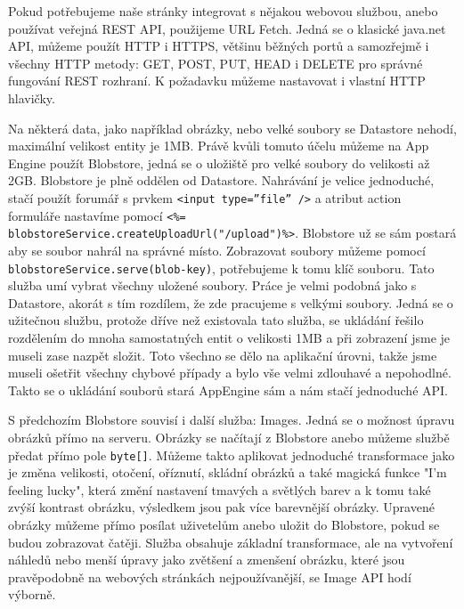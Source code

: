 Pokud potřebujeme naše stránky integrovat s nějakou webovou službou, anebo používat veřejná REST API, použijeme URL Fetch. Jedná se o klasické java.net API, můžeme použít HTTP i HTTPS, většinu běžných portů a samozřejmě i všechny HTTP metody: GET, POST, PUT, HEAD i DELETE pro správné fungování REST rozhraní. K požadavku můžeme nastavovat i vlastní HTTP hlavičky.

Na některá data, jako například obrázky, nebo velké soubory se Datastore nehodí, maximální velikost entity je 1MB. Právě kvůli tomuto účelu můžeme na App Engine použít Blobstore, jedná se o uložiště pro velké soubory do velikosti až 2GB. Blobstore je plně oddělen od Datastore. Nahrávání je velice jednoduché, stačí použít forumář s prvkem \verb|<input type=”file” />| a atribut action formuláře nastavíme pomocí \verb|<%= blobstoreService.createUploadUrl("/upload")%>|.
Blobstore už se sám postará aby se soubor nahrál na správné místo. Zobrazovat soubory můžeme pomocí \verb|blobstoreService.serve(blob-key)|, potřebujeme k tomu klíč souboru. Tato služba umí vybrat všechny uložené soubory. Práce je velmi podobná jako s Datastore, akorát s tím rozdílem, že zde pracujeme s velkými soubory. Jedná se o užitečnou službu, protože dříve než existovala tato služba, se ukládání řešilo rozdělením do mnoha samostatných entit o velikosti 1MB a při zobrazení jsme je museli zase nazpět složit. Toto všechno se dělo na aplikační úrovni, takže jsme museli ošetřit všechny chybové případy a bylo vše velmi zdlouhavé a nepohodlné. Takto se o ukládání souborů stará AppEngine sám a nám stačí jednoduché API.

S předchozím Blobstore souvisí i další služba: Images. Jedná se o možnost úpravu obrázků přímo na serveru. Obrázky se načítají z Blobstore anebo můžeme službě předat přímo pole \verb|byte[]|. Můžeme takto aplikovat jednoduché transformace jako je změna velikosti, otočení, oříznutí, skládní obrázků a také magická funkce "I’m feeling lucky", která změní nastavení tmavých a světlých barev a k tomu také zvýší kontrast obrázku, výsledkem jsou pak více barevnější obrázky. Upravené obrázky můžeme přímo posílat uživetelům anebo uložit do Blobstore, pokud se budou zobrazovat čatěji. Služba obsahuje základní transformace, ale na vytvoření náhledů nebo menší úpravy jako zvětšení a zmenšení obrázku, které jsou pravěpodobně na webových stránkách nejpoužívanější, se Image API hodí výborně.

